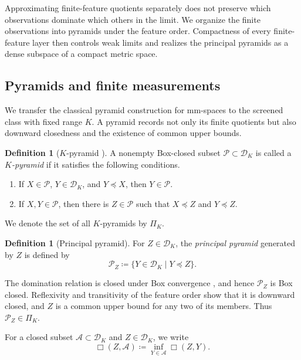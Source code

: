 \documentclass[11pt]{amsart}
\theoremstyle{plain}
\theoremstyle{definition}
\newtheorem{definition}[theorem]{Definition}
\theoremstyle{remark}
\newcommand{\DK}{\mathcal D_K}
\begin{document}
Approximating finite-feature quotients separately does not preserve which observations dominate which others in the limit. We organize the finite observations into pyramids under the feature order. Compactness of every finite-feature layer then controls weak limits and realizes the principal pyramids as a dense subspace of a compact metric space.

\subsection{Pyramids and finite measurements}
\label{subsec:pyramid-measurements}

We transfer the classical pyramid construction for mm-spaces to the screened class with fixed range $K$. A pyramid records not only its finite quotients but also downward closedness and the existence of common upper bounds.

\begin{definition}[$K$-pyramid {\cite[Definitions~6.3--6.4]{shioya2016mmg}}]
\label{def:K-pyramid}
A nonempty Box-closed subset $\mathcal P\subset\DK$ is called a \emph{$K$-pyramid} if it satisfies the following conditions.
\begin{enumerate}
\item If $X\in\mathcal P$, $Y\in\DK$, and $Y\preceq X$, then $Y\in\mathcal P$.
\item If $X,Y\in\mathcal P$, then there is $Z\in\mathcal P$ such that $X\preceq Z$ and $Y\preceq Z$.
\end{enumerate}
\end{definition}

We denote the set of all $K$-pyramids by $\Pi_K$.

\begin{definition}[Principal pyramid]
\label{def:principal-pyramid}
For $Z\in\DK$, the \emph{principal pyramid} generated by $Z$ is defined by
\[
\mathcal P_Z\coloneqq\{Y\in\DK\mid Y\preceq Z\}.
\]
\end{definition}

The domination relation is closed under Box convergence \cite[Theorem~4.16]{gds1}, and hence $\mathcal P_Z$ is Box closed. Reflexivity and transitivity of the feature order show that it is downward closed, and $Z$ is a common upper bound for any two of its members. Thus $\mathcal P_Z\in\Pi_K$.

For a closed subset $\mathcal A\subset\DK$ and $Z\in\DK$, we write
\[
\Box(Z,\mathcal A)\coloneqq\inf_{Y\in\mathcal A}\Box(Z,Y).
\]
\end{document}
